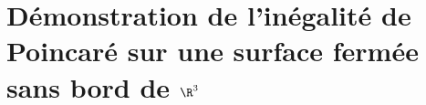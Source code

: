 \chapter{Démonstration de l'inégalité de Poincaré \ddfv sur une surface fermée sans bord de \texorpdfstring{$\R^3$}{R3}} \label{chap:demo_ineg_poincare}


